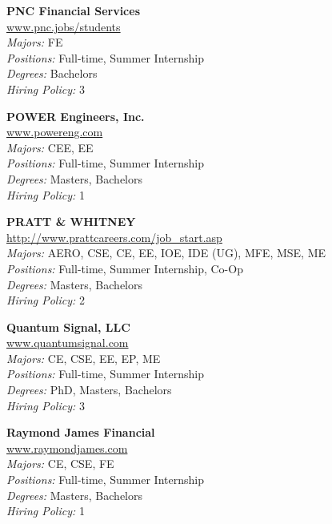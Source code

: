 \documentclass{article}
\begin{document}
\begin{center}
\begin{multicols}{3}
\begin{minipage}{.9\columnwidth}{\Large\bf PNC Financial Services }\\
	\url{www.pnc.jobs/students}\\
	\emph{Majors:} FE\\
	\emph{Positions:} Full-time, Summer Internship\\
	\emph{Degrees:} Bachelors\\
	\emph{Hiring Policy:} 3\\
\end{minipage}
 
\begin{minipage}{.9\columnwidth}{\Large\bf POWER Engineers, Inc. }\\
	\url{www.powereng.com}\\
	\emph{Majors:} CEE, EE\\
	\emph{Positions:} Full-time, Summer Internship\\
	\emph{Degrees:} Masters, Bachelors\\
	\emph{Hiring Policy:} 1\\
\end{minipage}
 
\begin{minipage}{.9\columnwidth}{\Large\bf PRATT \& WHITNEY }\\
	\url{http://www.prattcareers.com/job_start.asp}\\
	\emph{Majors:} AERO, CSE, CE, EE, IOE, IDE (UG), MFE, MSE, ME\\
	\emph{Positions:} Full-time, Summer Internship, Co-Op\\
	\emph{Degrees:} Masters, Bachelors\\
	\emph{Hiring Policy:} 2\\
\end{minipage}
 
\begin{minipage}{.9\columnwidth}{\Large\bf Quantum Signal, LLC }\\
	\url{www.quantumsignal.com}\\
	\emph{Majors:} CE, CSE, EE, EP, ME\\
	\emph{Positions:} Full-time, Summer Internship\\
	\emph{Degrees:} PhD, Masters, Bachelors\\
	\emph{Hiring Policy:} 3\\
\end{minipage}
 
\begin{minipage}{.9\columnwidth}{\Large\bf Raymond James Financial }\\
	\url{www.raymondjames.com}\\
	\emph{Majors:} CE, CSE, FE\\
	\emph{Positions:} Full-time, Summer Internship\\
	\emph{Degrees:} Masters, Bachelors\\
	\emph{Hiring Policy:} 1\\
\end{minipage}
 

\end{multicols}
\end{center}
\end{document}

